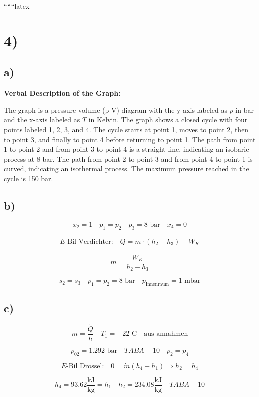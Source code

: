 
``````latex


\section*{4)}

\subsection*{a)}

\textbf{Verbal Description of the Graph:}

The graph is a pressure-volume (p-V) diagram with the y-axis labeled as \( p \) in bar and the x-axis labeled as \( T \) in Kelvin. The graph shows a closed cycle with four points labeled 1, 2, 3, and 4. The cycle starts at point 1, moves to point 2, then to point 3, and finally to point 4 before returning to point 1. The path from point 1 to point 2 and from point 3 to point 4 is a straight line, indicating an isobaric process at 8 bar. The path from point 2 to point 3 and from point 4 to point 1 is curved, indicating an isothermal process. The maximum pressure reached in the cycle is 150 bar.

\subsection*{b)}

\[
x_2 = 1 \quad p_1 = p_2 \quad p_3 = 8 \text{ bar} \quad x_4 = 0
\]

\[
E\text{-Bil Verdichter:} \quad \dot{Q} = \dot{m} \cdot (h_2 - h_3) - \dot{W}_K
\]

\[
\dot{m} = \frac{\dot{W}_K}{h_2 - h_3}
\]

\[
s_2 = s_3 \quad p_1 = p_2 = 8 \text{ bar} \quad p_{\text{Innenraum}} = 1 \text{ mbar}
\]

\subsection*{c)}

\[
\dot{m} = \frac{\dot{Q}}{h} \quad T_{1} = -22^\circ \text{C} \quad \text{aus annahmen}
\]

\[
p_{02} = 1.292 \text{ bar} \quad TAB A-10 \quad p_2 = p_4
\]

\[
E\text{-Bil Drossel:} \quad 0 = \dot{m} (h_4 - h_1) \Rightarrow h_2 = h_4
\]

\[
h_4 = 93.62 \frac{\text{kJ}}{\text{kg}} = h_1 \quad h_2 = 234.08 \frac{\text{kJ}}{\text{kg}} \quad TAB A-10
\]

